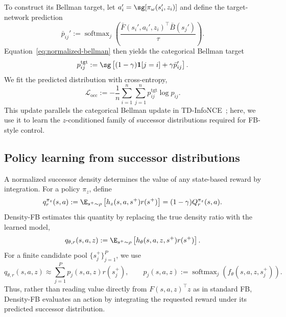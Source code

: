 To construct its Bellman target, let $a_i'=\sg[\pi_\omega(s_i',z_i)]$ and define the target-network prediction
\begin{equation}
    \bar p_{ij}' := \operatorname{softmax}_{j}\left(\frac{\bar F(s_i',a_i',z_i)^\top\bar B(s_j')}{\tau}\right).
    \label{eq:target-density-softmax}
\end{equation}
Equation~\eqref{eq:normalized-bellman} then yields the categorical Bellman target
\begin{equation}
    p_{ij}^{\mathrm{tgt}} := \sg\left[(1-\gamma)\mathbf 1[j=i]+\gamma\bar p_{ij}'\right].
    \label{eq:bellman-target}
\end{equation}
We fit the predicted distribution with cross-entropy,
\begin{equation}
    \mathcal L_{\mathrm{occ}} := -\frac{1}{n}\sum_{i=1}^{n}\sum_{j=1}^{n}p_{ij}^{\mathrm{tgt}}\log p_{ij}.
    \label{eq:occupancy-loss}
\end{equation}
This update parallels the categorical Bellman update in TD-InfoNCE~\citep{zheng-iclr24a}; here, we use it to learn the $z$-conditioned family of successor distributions required for FB-style control.

\subsection{Policy learning from successor distributions}
\label{sec:method-control}

A normalized successor density determines the value of any state-based reward by integration. 
For a policy $\pi_z$, define
\begin{equation}
    q_r^{\pi_z}(s,a) := \E_{s^+\sim\rho}\left[h_z(s,a,s^+)r(s^+)\right] = (1-\gamma)Q_r^{\pi_z}(s,a).
    \label{eq:normalized-value}
\end{equation}
Density-FB estimates this quantity by replacing the true density ratio with the learned model,
\begin{equation}
    q_{\theta,r}(s,a,z) := \E_{s^+\sim\rho}\left[h_\theta(s,a,z,s^+)r(s^+)\right].
    \label{eq:reward-readout-population}
\end{equation}
For a finite candidate pool $\{s_j^+\}_{j=1}^{P}$, we use
\begin{equation}
    q_{\theta,r}(s,a,z) \approx \sum_{j=1}^{P}p_j(s,a,z)r(s_j^+), \qquad p_j(s,a,z):=\operatorname{softmax}_{j}\left(f_\theta(s,a,z,s_j^+)\right).
    \label{eq:reward-readout}
\end{equation}
Thus, rather than reading value directly from $F(s,a,z)^\top z$ as in standard FB, Density-FB evaluates an action by integrating the requested reward under its predicted successor distribution.

